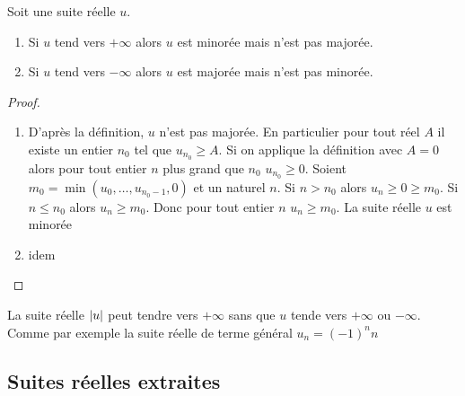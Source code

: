 \begin{prop}
  Soit une suite réelle $u$.
  \begin{enumerate}
  \item Si $u$ tend vers $+\infty$ alors $u$ est minorée mais n'est pas majorée.
  \item Si $u$ tend vers $-\infty$ alors $u$ est majorée mais n'est pas minorée.
  \end{enumerate}
\end{prop}
\begin{proof}
  \begin{enumerate}
  \item D'après la définition, $u$ n'est pas majorée. En particulier pour tout réel $A$ il existe un entier $n_0$ tel que $u_{n_0} \geqslant A$. Si on applique la définition avec $A=0$ alors pour tout entier $n$ plus grand que $n_0$ $u_{n_0} \geqslant 0$. Soient $m_0=\min(u_0,\ldots,u_{n_0-1},0)$ et un naturel $n$. Si $n > n_0$ alors $u_n \geqslant 0 \geqslant m_0$. Si $n \leqslant n_0$ alors $u_n \geqslant m_0$. Donc pour tout entier $n$ $u_n \geqslant m_0$. La suite réelle $u$ est minorée
  \item idem
  \end{enumerate}
\end{proof}
La suite réelle $\left\lvert u\right\rvert$ peut tendre vers $+\infty$ sans que $u$ tende vers $+\infty$ ou $-\infty$. Comme par exemple la suite réelle de terme général $u_n=(-1)^n n$

\subsection{Suites réelles extraites}

